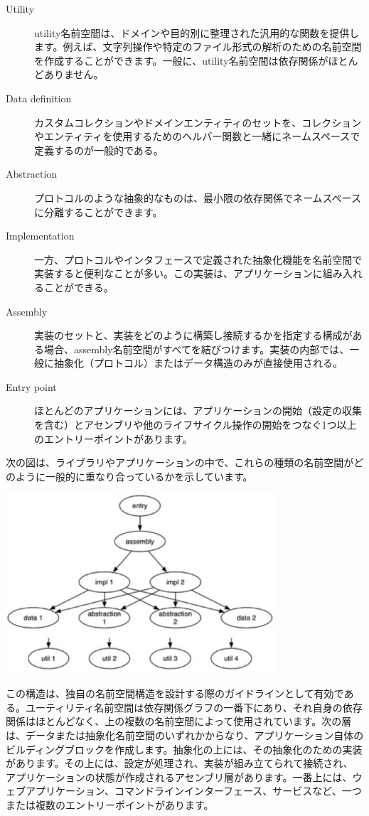 \begin{description}
\item [Utility] utility名前空間は、ドメインや目的別に整理された汎用的な関数を提供します。例えば、文字列操作や特定のファイル形式の解析のための名前空間を作成することができます。一般に、utility名前空間は依存関係がほとんどありません。
\item [Data definition] カスタムコレクションやドメインエンティティのセットを、コレクションやエンティティを使用するためのヘルパー関数と一緒にネームスペースで定義するのが一般的である。
\item [Abstraction] プロトコルのような抽象的なものは、最小限の依存関係でネームスペースに分離することができます。
\item [Implementation] 一方、プロトコルやインタフェースで定義された抽象化機能を名前空間で実装すると便利なことが多い。この実装は、アプリケーションに組み入れることができる。
\item [Assembly] 実装のセットと、実装をどのように構築し接続するかを指定する構成がある場合、assembly名前空間がすべてを結びつけます。実装の内部では、一般に抽象化（プロトコル）またはデータ構造のみが直接使用される。
\item [Entry point] ほとんどのアプリケーションには、アプリケーションの開始（設定の収集を含む）とアセンブリや他のライフサイクル操作の開始をつなぐ1つ以上のエントリーポイントがあります。
\end{description}

次の図は、ライブラリやアプリケーションの中で、これらの種類の名前空間がどのように一般的に重なり合っているかを示しています。

\includegraphics[width=10cm]{fig_06_001.eps}

この構造は、独自の名前空間構造を設計する際のガイドラインとして有効である。ユーティリティ名前空間は依存関係グラフの一番下にあり、それ自身の依存関係はほとんどなく、上の複数の名前空間によって使用されています。次の層は、データまたは抽象化名前空間のいずれかからなり、アプリケーション自体のビルディングブロックを作成します。抽象化の上には、その抽象化のための実装があります。その上には、設定が処理され、実装が組み立てられて接続され、 アプリケーションの状態が作成されるアセンブリ層があります。一番上には、ウェブアプリケーション、コマンドラインインターフェース、サービスなど、一つまたは複数のエントリーポイントがあります。

